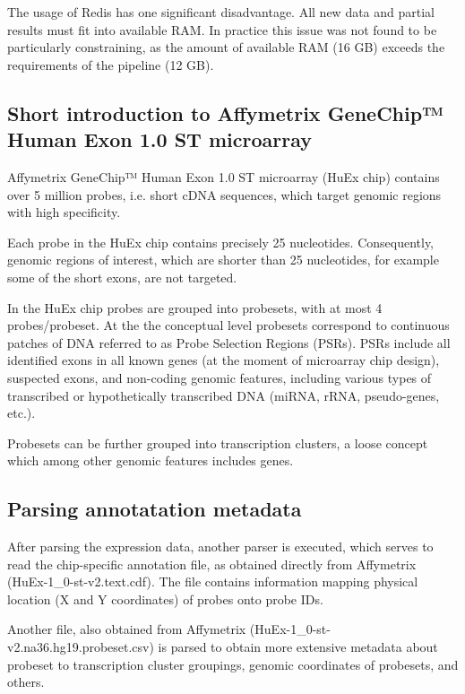The usage of Redis has one significant disadvantage. All new data and partial results must fit into available RAM. In practice this issue was not found to be particularly constraining, as the amount of available RAM (16 GB) exceeds the requirements of the pipeline (12 GB).

\subsection{Short introduction to Affymetrix GeneChip™ Human Exon 1.0 ST microarray}

Affymetrix GeneChip™ Human Exon 1.0 ST microarray (HuEx chip) contains over 5 million probes, i.e. short cDNA sequences, which target genomic regions with high specificity.

Each probe in the HuEx chip contains precisely 25 nucleotides. Consequently, genomic regions of interest, which are shorter than 25 nucleotides, for example some of the short exons, are not targeted.

In the HuEx chip probes are grouped into probesets, with at most 4 probes/probeset. At the the conceptual level probesets correspond to continuous patches of DNA referred to as Probe Selection Regions (PSRs). PSRs include all identified exons in all known genes (at the moment of microarray chip design), suspected exons, and non-coding genomic features, including various types of transcribed or hypothetically transcribed DNA (miRNA, rRNA, pseudo-genes, etc.).

Probesets can be further grouped into transcription clusters, a loose concept which among other genomic features includes genes.

\subsection{Parsing annotatation metadata} \label{section_parsingmetadata}

After parsing the expression data, another parser is executed, which serves to read the chip-specific annotation file, as obtained directly from Affymetrix (HuEx-1\_0-st-v2.text.cdf). The file contains information mapping physical location (X and Y coordinates) of probes onto probe IDs.

Another file, also obtained from Affymetrix (HuEx-1\_0-st-v2.na36.hg19.probeset.csv) is parsed to obtain more extensive metadata about probeset to transcription cluster groupings, genomic coordinates of probesets, and others.

